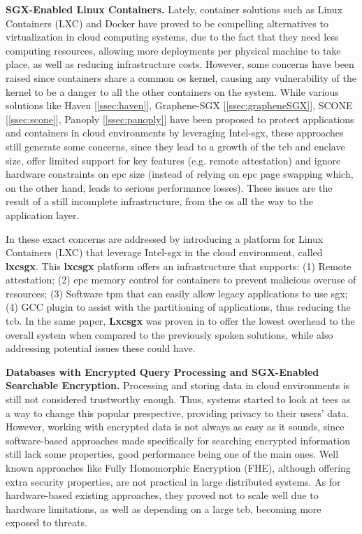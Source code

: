 \textbf{SGX-Enabled Linux Containers.}
Lately, container solutions such as Linux Containers (LXC) and Docker have proved to be compelling alternatives to virtualization in cloud computing systems, due to the fact that they need less computing resources, allowing more deployments per physical machine to take place, as well as reducing infrastructure costs. However, some concerns have been raised since containers share a common \gls{os} kernel, causing any vulnerability of the kernel to be a danger to all the other containers on the system.
While various solutions like Haven [\ref{ssec:haven}], Graphene-SGX [\ref{ssec:grapheneSGX}], SCONE [\ref{ssec:scone}], Panoply [\ref{ssec:panoply}] have been proposed to protect applications and containers in cloud environments by leveraging Intel-\gls{sgx}, these approaches still generate some concerns, since they lead to a growth of the \gls{tcb} and enclave size, offer limited support for key features (e.g. remote attestation) and ignore hardware constraints on \gls{epc} size (instead of relying on \gls{epc} page swapping which, on the other hand, leads to serious performance losses). 
These issues are the result of a still incomplete infrastructure, from the \gls{os} all the way to the application layer. 

In \cite{lxcsgxPaper} these exact concerns are addressed by introducing a platform for Linux Containers (LXC) that leverage Intel-\gls{sgx} in the cloud environment, called \textbf{lxcsgx}. 
This \textbf{lxcsgx} platform offers an infrastructure that supports: (1) Remote attestation; (2) \gls{epc} memory control for containers to prevent malicious overuse of resources; (3) Software \gls{tpm} that can easily allow legacy applications to use \gls{sgx}; (4) GCC plugin to assist with the partitioning of applications, thus reducing the \gls{tcb}.
In the same paper, \textbf{Lxcsgx} was proven in \cite{lxcsgxPaper} to offer the lowest overhead to the overall system when compared to the previously spoken solutions, while also addressing potential issues these could have.\newline

\textbf{Databases with Encrypted Query Processing and SGX-Enabled Searchable Encryption.}
Processing and storing data in cloud environments is still not considered trustworthy enough. Thus, systems started to look at \gls{tee}s as a way to change this popular prespective, providing privacy to their users' data. 
However, working with encrypted data is not always as easy as it sounds, since software-based approaches made specifically for searching encrypted information still lack some properties, good performance being one of the main ones. Well known approaches like Fully Homomorphic Encryption (FHE), although offering extra security properties, are not practical in large distributed systems. As for hardware-based existing approaches, they proved not to scale well due to hardware limitations, as well as depending on a large \gls{tcb}, becoming more exposed to threats.

